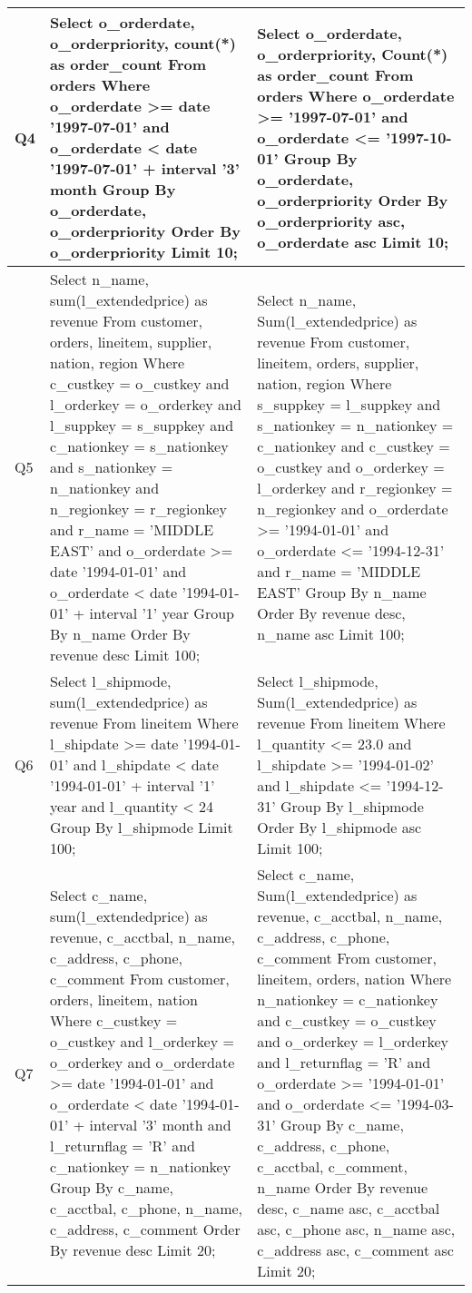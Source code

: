 {\begin{longtable}{|p{0.5cm}|p{7cm}|p{7cm}|}
Q4&
Select o\_orderdate, o\_orderpriority, count(*) as order\_count From orders Where o\_orderdate >= date '1997-07-01' and o\_orderdate < date '1997-07-01' + interval '3' month Group By o\_orderdate, o\_orderpriority Order By o\_orderpriority Limit 10;&
Select o\_orderdate, o\_orderpriority, Count(*) as order\_count From orders Where o\_orderdate  >= '1997-07-01' and o\_orderdate <= '1997-10-01' Group By o\_orderdate, o\_orderpriority Order By o\_orderpriority asc, o\_orderdate asc Limit 10;\\\hline
Q5&
Select  n\_name, sum(l\_extendedprice) as revenue From  customer, orders, lineitem, supplier, nation, region Where  c\_custkey = o\_custkey and l\_orderkey = o\_orderkey and l\_suppkey = s\_suppkey and c\_nationkey = s\_nationkey and s\_nationkey = n\_nationkey and n\_regionkey = r\_regionkey and r\_name = 'MIDDLE EAST' and o\_orderdate >= date '1994-01-01' and o\_orderdate < date '1994-01-01' + interval '1' year Group By n\_name Order By  revenue desc Limit  100;&
Select n\_name, Sum(l\_extendedprice) as revenue From customer, lineitem, orders, supplier, nation, region Where s\_suppkey = l\_suppkey and s\_nationkey = n\_nationkey = c\_nationkey and c\_custkey = o\_custkey and o\_orderkey = l\_orderkey and r\_regionkey = n\_regionkey and o\_orderdate  >= '1994-01-01' and o\_orderdate <= '1994-12-31' and r\_name  = 'MIDDLE EAST' Group By n\_name Order By revenue desc, n\_name asc Limit 100;\\\hline
Q6&
Select  l\_shipmode, sum(l\_extendedprice) as revenue From  lineitem Where  l\_shipdate >= date '1994-01-01' and l\_shipdate < date '1994-01-01' + interval '1' year and l\_quantity < 24 Group By  l\_shipmode Limit  100;&
Select l\_shipmode, Sum(l\_extendedprice) as revenue From lineitem Where l\_quantity  <= 23.0 and l\_shipdate  >= '1994-01-02' and l\_shipdate <= '1994-12-31' Group By l\_shipmode Order By l\_shipmode asc Limit 100;\\\hline
Q7&
Select  c\_name, sum(l\_extendedprice) as revenue, c\_acctbal, n\_name, c\_address, c\_phone, c\_comment From  customer, orders, lineitem, nation Where  c\_custkey = o\_custkey and l\_orderkey = o\_orderkey and o\_orderdate >= date '1994-01-01' and o\_orderdate < date '1994-01-01' + interval '3' month and l\_returnflag = 'R' and c\_nationkey = n\_nationkey Group By  c\_name, c\_acctbal, c\_phone, n\_name, c\_address, c\_comment Order By  revenue desc Limit  20;&
Select c\_name, Sum(l\_extendedprice) as revenue, c\_acctbal, n\_name, c\_address, c\_phone, c\_comment From customer, lineitem, orders, nation Where n\_nationkey = c\_nationkey and c\_custkey = o\_custkey and o\_orderkey = l\_orderkey and l\_returnflag  = 'R' and o\_orderdate  >= '1994-01-01' and o\_orderdate <= '1994-03-31' Group By c\_name, c\_address, c\_phone, c\_acctbal, c\_comment, n\_name Order By revenue desc, c\_name asc, c\_acctbal asc, c\_phone asc, n\_name asc, c\_address asc, c\_comment asc Limit 20;\\\hline

\end{longtable}}
